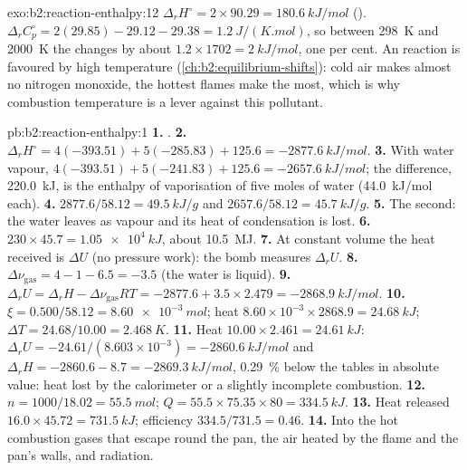 \begin{solution}{exo:b2:reaction-enthalpy:12}
$\Delta_r H^\circ = 2 \times 90.29 = \qty{+180.6}{kJ/mol}$ ().
$\Delta_r C_p^\circ = 2(29.85) - 29.12 - 29.38 = \qty{1.2}{J/(K.mol)}$, so
between \qty{298}{K} and \qty{2000}{K} the  changes by
about $1.2 \times 1702 = \qty{2}{kJ/mol}$, one per cent. An 
reaction is favoured by high temperature (\cref{ch:b2:equilibrium-shifts}):
cold air makes almost no nitrogen monoxide, the hottest flames make the
most, which is why combustion temperature is a lever against this
pollutant.
\end{solution}

\begin{solution}{pb:b2:reaction-enthalpy:1}
\textbf{1.} .
\textbf{2.} $\Delta_r H^\circ = 4(-393.51) + 5(-285.83) + 125.6 =
\qty{-2877.6}{kJ/mol}$.
\textbf{3.} With water vapour, $4(-393.51) + 5(-241.83) + 125.6 =
\qty{-2657.6}{kJ/mol}$; the difference, \qty{220.0}{kJ}, is the enthalpy of
vaporisation of five moles of water (\qty{44.0}{kJ/mol} each).
\textbf{4.} $2877.6/58.12 = \qty{49.5}{kJ/g}$ and $2657.6/58.12 =
\qty{45.7}{kJ/g}$.
\textbf{5.} The second: the water leaves as vapour and its heat of
condensation is lost.
\textbf{6.} $230 \times 45.7 = \qty{1.05e4}{kJ}$, about \qty{10.5}{MJ}.
\textbf{7.} At constant volume the heat received is $\Delta U$ (no
pressure work): the bomb measures $\Delta_r U$.
\textbf{8.} $\Delta\nu_{\text{gas}} = 4 - 1 - 6.5 = -3.5$ (the water is
liquid).
\textbf{9.} $\Delta_r U = \Delta_r H - \Delta\nu_{\text{gas}}RT = -2877.6 +
3.5 \times 2.479 = \qty{-2868.9}{kJ/mol}$.
\textbf{10.} $\xi = 0.500/58.12 = \qty{8.60e-3}{mol}$; heat $8.60 \times
10^{-3} \times 2868.9 = \qty{24.68}{kJ}$; $\Delta T = 24.68/10.00 =
\qty{2.468}{K}$.
\textbf{11.} Heat $10.00 \times 2.461 = \qty{24.61}{kJ}$: $\Delta_r U =
-24.61/(8.603 \times 10^{-3}) = \qty{-2860.6}{kJ/mol}$ and $\Delta_r H =
-2860.6 - 8.7 = \qty{-2869.3}{kJ/mol}$, \qty{0.29}{\percent} below the
tables in absolute value: heat lost by the calorimeter or a slightly
incomplete combustion.
\textbf{12.} $n = 1000/18.02 = \qty{55.5}{mol}$; $Q = 55.5 \times 75.35
\times 80 = \qty{334.5}{kJ}$.
\textbf{13.} Heat released $16.0 \times 45.72 = \qty{731.5}{kJ}$; efficiency
$334.5/731.5 = 0.46$.
\textbf{14.} Into the hot combustion gases that escape round the pan, the
air heated by the flame and the pan's walls, and radiation.

\end{solution}

